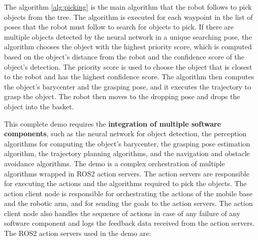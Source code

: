 The algorithm \ref{alg:picking} is the main algorithm that the robot follows to pick objects from the tree.
The algorithm is executed for each waypoint in the list of poses that the robot must follow to search
for objects to pick. If there are multiple objects detected by the neural network in a unique searching pose,
the algorithm chooses the object with the highest priority score, which is computed based on the object's distance
from the robot and the confidence score of the object's detection. The priority score is used to choose the object
that is closest to the robot and has the highest confidence score. The algorithm then computes the object's barycenter
and the grasping pose, and it executes the trajectory to grasp the object. The robot then moves to the dropping pose
and drops the object into the basket. 

This complete demo requires the \textbf{integration of multiple software components},
such as the neural network for object detection,
the perception algorithms for computing the object's barycenter, the grasping pose estimation algorithm, the trajectory
planning algorithms, and the navigation and obstacle avoidance algorithms. The demo is a complex orchestration of
multiple algorithms wrapped in ROS2 action servers. The action servers are responsible for executing the actions
and the algorithms required to pick the objects. The action client node is responsible for orchestrating the actions
of the mobile base and the robotic arm, and for sending the goals to the action servers. The action client node
also handles the sequence of actions in case of any failure of any software component and logs the feedback data
received from the action servers. The ROS2 action servers used in the demo are:

